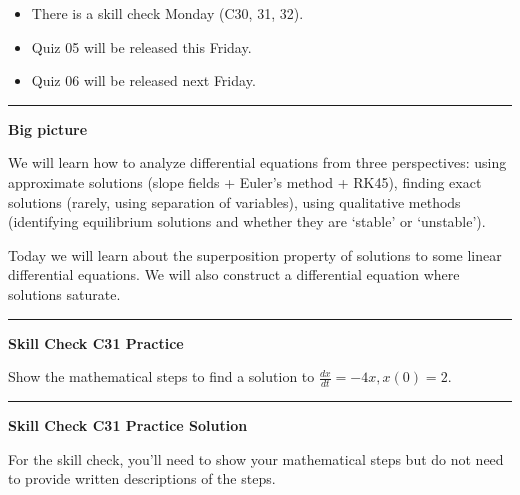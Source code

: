 \documentclass[12pt,letterpaper,noanswers]{exam}
\begin{document}
 \pdfpageheight 11in 
  \pdfpagewidth 8.5in





\begin{itemize}
\itemsep0em
\item There is a skill check Monday (C30, 31, 32).
\item Quiz 05 will be released this Friday.
\item Quiz 06 will be released next Friday.
\end{itemize}

\hrule
\vspace{0.2cm}


\noindent\textbf{Big picture}

We will learn how to analyze differential equations from three perspectives: using approximate solutions (slope fields + Euler's method + RK45), finding exact solutions (rarely, using separation of variables), using qualitative methods (identifying equilibrium solutions and whether they are `stable' or `unstable').

Today we will learn about the superposition property of solutions to some linear differential equations.  We will also construct a differential equation where solutions saturate.

\vspace{0.2cm}
\hrule
\vspace{0.2cm}

\noindent \textbf{Skill Check C31 Practice}

Show the mathematical steps to find a solution to $\frac{dx}{dt} = -4x, x(0) = 2$.

\vspace{0.2cm}
\hrule
\vspace{0.2cm}

\noindent \textbf{Skill Check C31 Practice Solution}

For the skill check, you'll need to show your mathematical steps but do not need to provide written descriptions of the steps.
\end{document}
